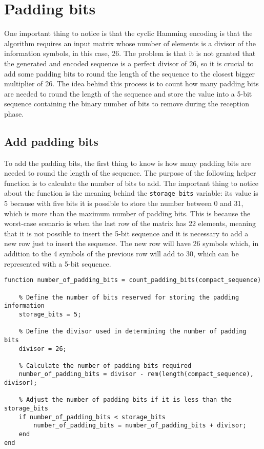 \vspace{40px} \section{Padding bits}
One important thing to notice is that the cyclic Hamming encoding is that the algorithm requires an input matrix whose number of elements is a divisor of the information symbols, in this case, 26. The problem is that it is not granted that the generated and encoded sequence is a perfect divisor of 26, so it is crucial to add some padding bits to round the length of the sequence to the closest bigger multiplier of 26. The idea behind this process is to count how many padding bits are needed to round the length of the sequence and store the value into a 5-bit sequence containing the binary number of bits to remove during the reception phase.


\subsection{Add padding bits}
To add the padding bits, the first thing to know is how many padding bits are needed to round the length of the sequence. The purpose of the following helper function is to calculate the number of bits to add. The important thing to notice about the function is the meaning behind the \texttt{storage\_bits} variable: its value is 5 because with five bits it is possible to store the number between 0 and 31, which is more than the maximum number of padding bits. This is because the worst-case scenario is when the last row of the matrix has 22 elements, meaning that it is not possible to insert the 5-bit sequence and it is necessary to add a new row just to insert the sequence. The new row will have 26 symbols which, in addition to the 4 symbols of the previous row will add to 30, which can be represented with a 5-bit sequence.

\begin{lstlisting}
function number_of_padding_bits = count_padding_bits(compact_sequence)

    % Define the number of bits reserved for storing the padding information
    storage_bits = 5;

    % Define the divisor used in determining the number of padding bits
    divisor = 26;

    % Calculate the number of padding bits required
    number_of_padding_bits = divisor - rem(length(compact_sequence), divisor);

    % Adjust the number of padding bits if it is less than the storage_bits
    if number_of_padding_bits < storage_bits
        number_of_padding_bits = number_of_padding_bits + divisor;
    end
end
\end{lstlisting}

